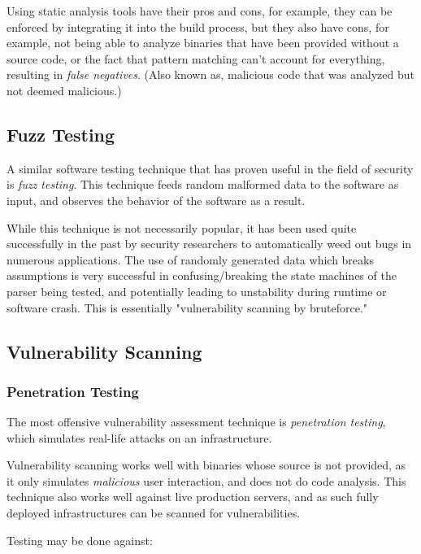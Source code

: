 \documentclass[a4paper,12pt]{article}
\begin{document}
	Using static analysis tools have their pros and cons, for example, they can be enforced by integrating it into the build process, but they also have cons, for example, not being able to analyze binaries that have been provided without a source code, or the fact that pattern matching can't account for everything, resulting in \textit{false negatives}. (Also known as, malicious code that was analyzed but not deemed malicious.)
	
\subsection{Fuzz Testing}
	
	A similar software testing technique that has proven useful in the field of security is \textit{fuzz testing}. This technique feeds random malformed data to the software as input, and observes the behavior of the software as a result.
	
	While this technique is not necessarily popular, it has been used quite successfully in the past by security researchers to automatically weed out bugs in numerous applications.\cite{mzalewski15} The use of randomly generated data which breaks assumptions is very successful in confusing/breaking the state machines of the parser being tested, and potentially leading to unstability during runtime or software crash. This is essentially "vulnerability scanning by bruteforce."
	
\subsection{Vulnerability Scanning}
	
\subsubsection{Penetration Testing}
	
	The most offensive vulnerability assessment technique is \textit{penetration testing}, which simulates real-life attacks on an infrastructure.
	
	Vulnerability scanning works well with binaries whose source is not provided, as it only simulates \textit{malicious} user interaction, and does not do code analysis. This technique also works well against live production servers, and as such fully deployed infrastructures can be scanned for vulnerabilities. 
	
	\noindent Testing may be done against:
	
\end{document}
